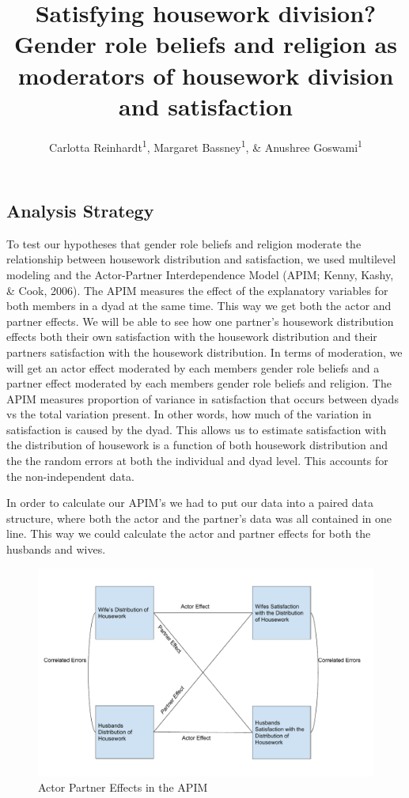 \documentclass[
  man,floatsintext]{apa6}
\title{Satisfying housework division? Gender role beliefs and religion as moderators of housework division and satisfaction}
\author{Carlotta Reinhardt\textsuperscript{1}, Margaret Bassney\textsuperscript{1}, \& Anushree Goswami\textsuperscript{1}}
\date{}
\affiliation{\vspace{0.5cm}\textsuperscript{1} Smith College}
\begin{document}
\maketitle

\hypertarget{analysis-strategy}{%
\subsection{Analysis Strategy}\label{analysis-strategy}}

To test our hypotheses that gender role beliefs and religion moderate the relationship between housework distribution and satisfaction, we used multilevel modeling and the Actor-Partner Interdependence Model (APIM; Kenny, Kashy, \& Cook, 2006). The APIM measures the effect of the explanatory variables for both members in a dyad at the same time. This way we get both the actor and partner effects. We will be able to see how one partner's housework distribution effects both their own satisfaction with the housework distribution and their partners satisfaction with the housework distribution. In terms of moderation, we will get an actor effect moderated by each members gender role beliefs and a partner effect moderated by each members gender role beliefs and religion. The APIM measures proportion of variance in satisfaction that occurs between dyads vs the total variation present. In other words, how much of the variation in satisfaction is caused by the dyad. This allows us to estimate satisfaction with the distribution of housework is a function of both housework distribution and the the random errors at both the individual and dyad level. This accounts for the non-independent data.

In order to calculate our APIM's we had to put our data into a paired data structure, where both the actor and the partner's data was all contained in one line. This way we could calculate the actor and partner effects for both the husbands and wives.


\begin{figure}
\centering
\includegraphics{APIM_Housework_Distribution.pdf}
\caption{\label{fig:my-figure}Actor Partner Effects in the APIM}
\end{figure}
\end{document}
